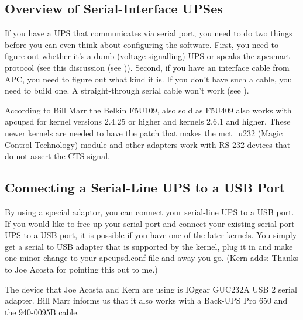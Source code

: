 {{{{{{{{{{\subsection*{Overview of Serial-Interface UPSes}

\label{index-Serial-UPSes-189}
If you have a UPS that communicates via serial port, you need to do two things
before you can even think about configuring the software. First, you need to
figure out whether it's a dumb (voltage-signalling) UPS or speaks the apcsmart
protocol (see this discussion (see 
)).  Second, if you have an interface
cable from APC, you need to figure out what kind it is.  If you don't have
such a cable, you need to build one.  A straight-through serial cable won't
work (see 
).  

According to Bill Marr the Belkin F5U109, also sold as F5U409 also works with
apcupsd for kernel versions 2.4.25 or higher and kernels 2.6.1 and higher. 
These newer kernels are needed to have the patch that makes the mct\_u232
(Magic Control Technology) module and other adapters work with RS-232 devices
that do not assert the CTS signal. 

\label{Connecting-a-Serial_002dLine-UPS-to-a-USB-Port}

\subsection*{Connecting a Serial-Line UPS to a USB Port}

\label{index-Serial-on-USB-190}
By using a special adaptor, you can connect your serial-line UPS to a USB
port. If you would like to free up your serial port and connect your existing
serial port UPS to a USB port, it is possible if you have one of the later
kernels. You simply get a serial to USB adapter that is supported by the
kernel, plug it in and make one minor change to your apcupsd.conf file and
away you go. (Kern adds: Thanks to Joe Acosta for pointing this out to me.)  

The device that Joe Acosta and Kern are using is IOgear GUC232A USB 2 serial
adapter. Bill Marr informs us that it also works with a Back-UPS Pro 650 and
the 940-0095B cable.  

}}}}}}}}}}
